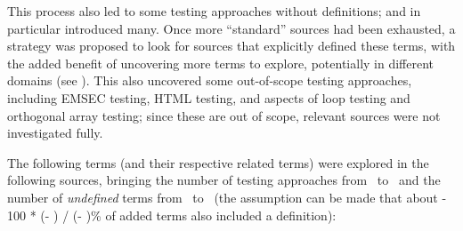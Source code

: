 This process also led to some testing approaches without definitions;
\citep{IEEE2022} and \citep{Firesmith2015} in particular introduced many.
Once more ``standard'' sources had been exhausted, a strategy was proposed to
look for sources that explicitly defined these terms, with the added benefit of
uncovering more terms to explore, potentially in different domains (see
). This also uncovered some out-of-scope testing approaches,
including EMSEC testing, HTML testing, and aspects of loop testing and
orthogonal array testing; since these
are out of scope, relevant sources were not investigated fully.

The following terms (and their respective related terms)
were explored in the following sources, bringing the number of testing
approaches from \the\TotalBefore~to \the\TotalAfter~and the number of
\emph{undefined} terms from \the\UndefBefore~to \the\UndefAfter~(the assumption
can be made that about \the{} - 100 * (\UndefAfter - \UndefBefore) /
(\TotalAfter - \TotalBefore)\relax\% of added terms also included a definition):

